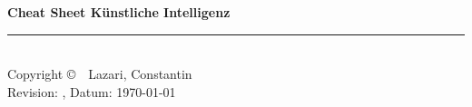 \documentclass[10pt,landscape]{scrartcl}
\newcommand{\myAuthor}{Lazari, Constantin}
\begin{document}
	\raggedright
	\footnotesize
	
	\setlength{\premulticols}{1pt}
	\setlength{\postmulticols}{1pt}
	\setlength{\multicolsep}{1pt}
	\setlength{\columnsep}{2pt}
	\newlength{\MyLen}

	\begin{center}
	\Large{\textbf{Cheat Sheet Künstliche Intelligenz}} \\
	\end{center}
	\begin{multicols}{3}

    
    
	\rule{0.3\linewidth}{0.25pt}\\
	\scriptsize
	Copyright \copyright\ \the\year~\myAuthor\\

	Revision: , Datum: \today\\
	\end{multicols}
\end{document}
